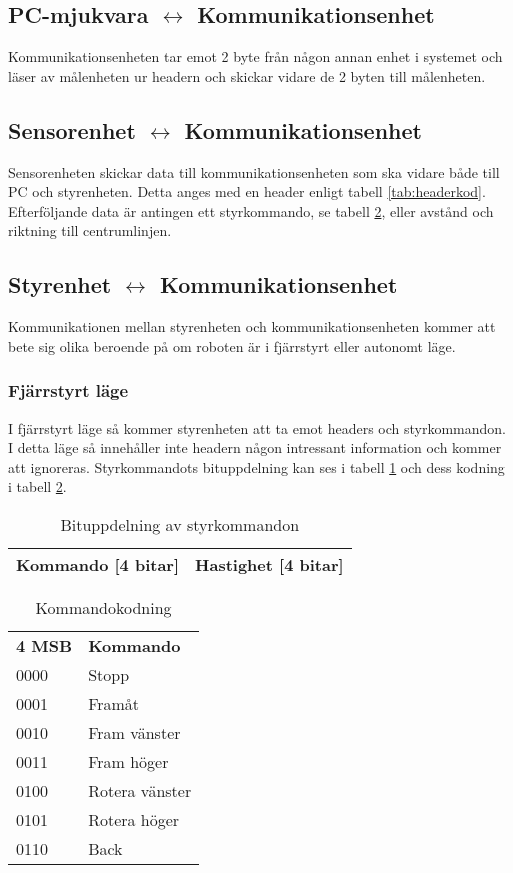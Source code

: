 \subsection{PC-mjukvara $\longleftrightarrow$ Kommunikationsenhet}
Kommunikationsenheten tar emot 2 byte från någon annan enhet i systemet och
läser av målenheten ur headern och skickar vidare de 2 byten till målenheten.

\subsection{Sensorenhet $\longleftrightarrow$ Kommunikationsenhet}
Sensorenheten skickar data till kommunikationsenheten som ska vidare både till PC och styrenheten. Detta anges med en header enligt tabell \ref{tab:headerkod}. Efterföljande data är antingen ett styrkommando, se tabell \ref{tab:styrkommando}, eller avstånd och riktning till centrumlinjen.

\subsection{Styrenhet $\longleftrightarrow$ Kommunikationsenhet}
Kommunikationen mellan styrenheten och kommunikationsenheten kommer att bete sig olika beroende på
om roboten är i fjärrstyrt eller autonomt läge.
\subsubsection{Fjärrstyrt läge}
I fjärrstyrt läge så kommer styrenheten att ta emot headers och styrkommandon. I detta läge så 
innehåller inte headern någon intressant information och kommer att ignoreras. Styrkommandots bituppdelning kan ses i 
tabell \ref{tab:styrbitar} och dess kodning i tabell \ref{tab:styrkommando}.
 
\begin{table}[h] 
  \centering
  \begin{tabular}{| c | c |}
    \hline
    Kommando [4 bitar] & Hastighet [4 bitar] \\ \hline
  \end{tabular}
  \caption{Bituppdelning av styrkommandon}
  \label{tab:styrbitar}
\end{table}

\begin{table}[h] 
  \centering
  \begin{tabular}{l l}
    \textbf{4 MSB} & \textbf{Kommando} \\
    0000 & Stopp \\
    0001 & Framåt \\
    0010 & Fram vänster \\
    0011 & Fram höger \\
    0100 & Rotera vänster \\
    0101 & Rotera höger \\
    0110 & Back \\
  \end{tabular}
  \caption{Kommandokodning}
  \label{tab:styrkommando}
\end{table}

